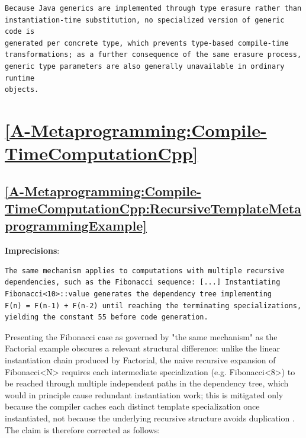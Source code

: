 \documentclass[11pt]{report}
\begin{document}
\begin{Verbatim}[breaklines=true]
Because Java generics are implemented through type erasure rather than
instantiation-time substitution, no specialized version of generic code is
generated per concrete type, which prevents type-based compile-time
transformations; as a further consequence of the same erasure process,
generic type parameters are also generally unavailable in ordinary runtime
objects.
\end{Verbatim}

\section*{\hyperref[A-Metaprogramming:Compile-TimeComputationCpp]{\ref*{A-Metaprogramming:Compile-TimeComputationCpp} }}

\subsection*{\hyperref[A-Metaprogramming:Compile-TimeComputationCpp:RecursiveTemplateMetaprogrammingExample]{\ref*{A-Metaprogramming:Compile-TimeComputationCpp:RecursiveTemplateMetaprogrammingExample} }}
\noindent\textbf{Imprecisions}:
\begin{Verbatim}[breaklines=true]
The same mechanism applies to computations with multiple recursive
dependencies, such as the Fibonacci sequence: [...] Instantiating
Fibonacci<10>::value generates the dependency tree implementing
F(n) = F(n-1) + F(n-2) until reaching the terminating specializations,
yielding the constant 55 before code generation.
\end{Verbatim}

Presenting the Fibonacci case as governed by "the same mechanism" as the
Factorial example obscures a relevant structural difference: unlike the
linear instantiation chain produced by Factorial, the naive recursive
expansion of Fibonacci<N> requires each intermediate specialization (e.g.
Fibonacci<8>) to be reached through multiple independent paths in the
dependency tree, which would in principle cause redundant instantiation
work; this is mitigated only because the compiler caches each distinct
template specialization once instantiated, not because the underlying
recursive structure avoids duplication \cite{cpp_templates2017}. The claim
is therefore corrected as follows:
\end{document}
